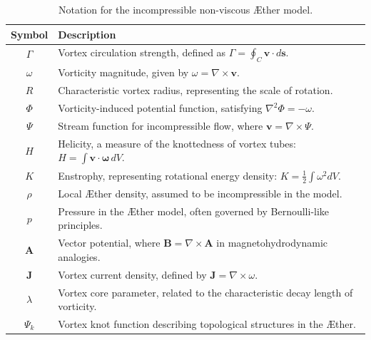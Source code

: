 \documentclass[a4paper,10pt]{article}
\begin{document}
        \begin{table}[h]
            \centering
            \renewcommand{\arraystretch}{1.3}
            \begin{tabular}{c l}
                \hline
                Symbol & Description \\
                \hline
                \( \Gamma \) & Vortex circulation strength, defined as \( \Gamma = \oint_C \mathbf{v} \cdot d\mathbf{s} \). \\                \( \omega \) & Vorticity magnitude, given by \( \omega = \nabla \times \mathbf{v} \). \\
                \( R \) & Characteristic vortex radius, representing the scale of rotation. \\
                \( \Phi \) & Vorticity-induced potential function, satisfying \( \nabla^2 \Phi = -\omega \). \\
                \( \Psi \) & Stream function for incompressible flow, where \( \mathbf{v} = \nabla \times \Psi \). \\
                \( H \) & Helicity, a measure of the knottedness of vortex tubes: \( H = \int \mathbf{v} \cdot \mathbf{\omega} \, dV \). \\
                \( K \) & Enstrophy, representing rotational energy density: \( K = \frac{1}{2} \int \omega^2 dV \). \\
                \( \rho \) & Local Æther density, assumed to be incompressible in the model. \\
                \( p \) & Pressure in the Æther model, often governed by Bernoulli-like principles. \\
                \( \mathbf{A} \) & Vector potential, where \( \mathbf{B} = \nabla \times \mathbf{A} \) in magnetohydrodynamic analogies. \\
                \( \mathbf{J} \) & Vortex current density, defined by \( \mathbf{J} = \nabla \times \omega \). \\
                \( \lambda \) & Vortex core parameter, related to the characteristic decay length of vorticity. \\
                \( \Psi_k \) & Vortex knot function describing topological structures in the Æther. \\
                \hline
            \end{tabular}
            \caption{Notation for the incompressible non-viscous Æther model.}
            \label{tab:notation2}
        \end{table}
\end{document}
